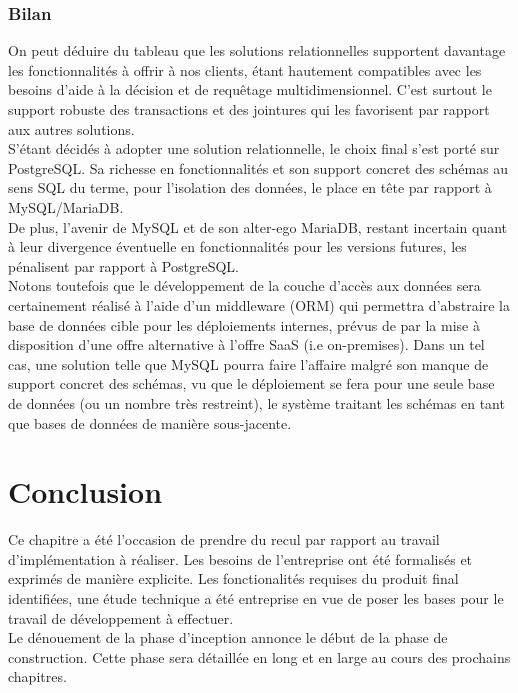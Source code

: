 \begin{spacing}{1.5}
\subsubsection{Bilan}%
On peut déduire du tableau que les solutions relationnelles supportent davantage les fonctionnalités à offrir à nos clients, étant hautement compatibles avec les besoins d’aide à la décision et de requêtage multidimensionnel. C’est surtout le support robuste des transactions et des jointures qui les favorisent par rapport aux autres solutions.\\
S'étant décidés à adopter une solution relationnelle, le choix final s’est porté sur PostgreSQL. Sa richesse en fonctionnalités et son support concret des schémas au sens SQL du terme, pour l’isolation des données, le place en tête par rapport à MySQL/MariaDB.\\
De plus, l’avenir de MySQL et de son alter-ego MariaDB, restant incertain quant à leur divergence éventuelle en fonctionnalités pour les versions futures, les pénalisent par rapport à PostgreSQL.\\

Notons toutefois que le développement de la couche d’accès aux données sera certainement réalisé à l’aide d’un middleware (ORM) qui permettra d’abstraire la base de données cible pour les déploiements internes, prévus de par la mise à disposition d’une offre alternative à l’offre SaaS (i.e on-premises). Dans un tel cas, une solution telle que MySQL pourra faire l’affaire malgré son manque de support concret des schémas, vu que le déploiement se fera pour une seule base de données (ou un nombre très restreint), le système traitant les schémas en tant que bases de données de manière sous-jacente.


\section*{Conclusion}
Ce chapitre a été l'occasion de prendre du recul par rapport au travail d'implémentation à réaliser. Les besoins de l'entreprise ont été formalisés et exprimés de manière explicite. Les fonctionalités requises du produit final identifiées, une étude technique a été entreprise en vue de poser les bases pour le travail de développement à effectuer.\\
Le dénouement de la phase d'inception annonce le début de la phase de construction. Cette phase sera détaillée en long et en large au cours des prochains chapitres.

\end{spacing}
